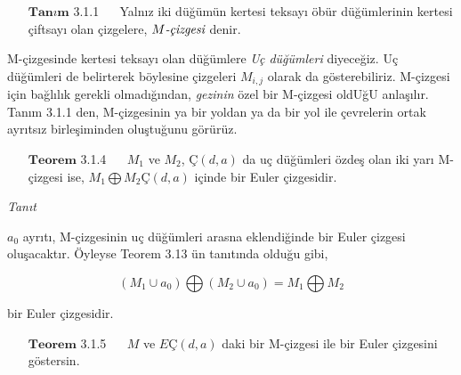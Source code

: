 \documentclass[11pt]{amsbook}
\begin{document}
	
	\begin{itemize}
		\item[$\mathbf{Tanım}$ 3.1.1  $\quad$]  Yalnız iki düğümün kertesi teksayı öbür düğümlerinin kertesi çiftsayı olan çizgelere, $M\emph{-çizgesi}$ denir. \par
	\end{itemize}
	
	M-çizgesinde kertesi teksayı olan düğümlere \emph{Uç düğümleri} diyeceğiz. Uç düğümleri de belirterek böylesine çizgeleri $M_{i,j}$ olarak da gösterebiliriz. M-çizgesi için bağlılık gerekli olmadığından, \emph{gezinin} özel bir M-çizgesi oldUğU anlaşılır. Tanım 3.1.1 den, M-çizgesinin ya bir yoldan ya da bir yol ile çevrelerin ortak ayrıtsız birleşiminden oluştuğunu görürüz.
	
	\begin{itemize}
		\item[$\mathbf{Teorem}$ 3.1.4  $\quad$]  $M_1$ ve $M_2$, $Ç(d,a)$ da uç düğümleri özdeş olan iki yarı M-çizgesi ise, $M_1 \bigoplus M_2 Ç(d,a)$ içinde bir Euler çizgesidir.\par
	\end{itemize}
	
	\emph{Tanıt}
	
	$a_0$ ayrıtı, M-çizgesinin uç düğümleri arasna eklendiğinde bir Euler çizgesi oluşacaktır. Öyleyse Teorem 3.13 ün tanıtında olduğu gibi,
	
	\begin{equation*}
	(M_1  \cup a_0) \bigoplus (M_2 \cup a_0) = M_1 \bigoplus M_2
	\end{equation*}
	
	bir Euler çizgesidir.
	
	\begin{itemize}
		\item[$\mathbf{Teorem}$ 3.1.5  $\quad$]  $M$ ve $E Ç(d,a)$ daki bir M-çizgesi ile bir Euler çizgesini göstersin.\par
	\end{itemize}
	
\end{document}
